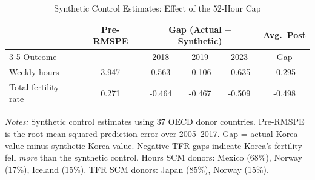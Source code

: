 \begin{table}[t]
\centering
\caption{Synthetic Control Estimates: Effect of the 52-Hour Cap}
\label{tab:scm}
\begin{tabular}{lccccc}
\toprule
 & Pre-RMSPE & \multicolumn{3}{c}{Gap (Actual $-$ Synthetic)} & Avg.\ Post \\
\cmidrule(lr){3-5}
 Outcome & & 2018 & 2019 & 2023 & Gap \\
\midrule
Weekly hours & 3.947 & 0.563 & -0.106 & -0.635 & -0.295 \\
Total fertility rate & 0.271 & -0.464 & -0.467 & -0.509 & -0.498 \\
\bottomrule
\end{tabular}
\begin{minipage}{0.95\textwidth}
\footnotesize\textit{Notes:} Synthetic control estimates using 37 OECD donor countries. Pre-RMSPE is the root mean squared prediction error over 2005--2017. Gap = actual Korea value minus synthetic Korea value. Negative TFR gaps indicate Korea's fertility fell \emph{more} than the synthetic control. Hours SCM donors: Mexico (68\%), Norway (17\%), Iceland (15\%). TFR SCM donors: Japan (85\%), Norway (15\%).
\end{minipage}
\end{table}
